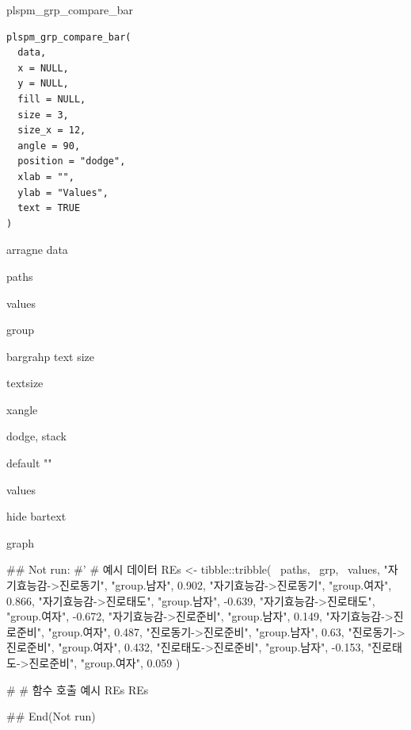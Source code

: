 \documentclass[a4paper]{book}
\begin{document}
%
\begin{Description}
plspm\_grp\_compare\_bar
\end{Description}
%
\begin{Usage}
\begin{verbatim}
plspm_grp_compare_bar(
  data,
  x = NULL,
  y = NULL,
  fill = NULL,
  size = 3,
  size_x = 12,
  angle = 90,
  position = "dodge",
  xlab = "",
  ylab = "Values",
  text = TRUE
)
\end{verbatim}
\end{Usage}
%
\begin{Arguments}
\begin{ldescription}
\item[\code{data}] arragne data

\item[\code{x}] paths

\item[\code{y}] values

\item[\code{fill}] group

\item[\code{size}] bargrahp text size

\item[\code{size\_x}] textsize

\item[\code{angle}] xangle

\item[\code{position}] dodge, stack

\item[\code{xlab}] default ""

\item[\code{ylab}] values

\item[\code{text}] hide bartext
\end{ldescription}
\end{Arguments}
%
\begin{Value}
graph
\end{Value}
%
\begin{Examples}
\begin{ExampleCode}

\#\# Not run: 
#'
# 예시 데이터
REs <- tibble::tribble(
  ~paths, ~grp, ~values,
  "자기효능감->진로동기", "group.남자", 0.902,
  "자기효능감->진로동기", "group.여자", 0.866,
  "자기효능감->진로태도", "group.남자", -0.639,
  "자기효능감->진로태도", "group.여자", -0.672,
  "자기효능감->진로준비", "group.남자", 0.149,
  "자기효능감->진로준비", "group.여자", 0.487,
  "진로동기->진로준비", "group.남자", 0.63,
  "진로동기->진로준비", "group.여자", 0.432,
  "진로태도->진로준비", "group.남자", -0.153,
  "진로태도->진로준비", "group.여자", 0.059
)

# # 함수 호출 예시
REs %
REs %

## End(Not run)
\end{ExampleCode}
\end{Examples}
\end{document}
